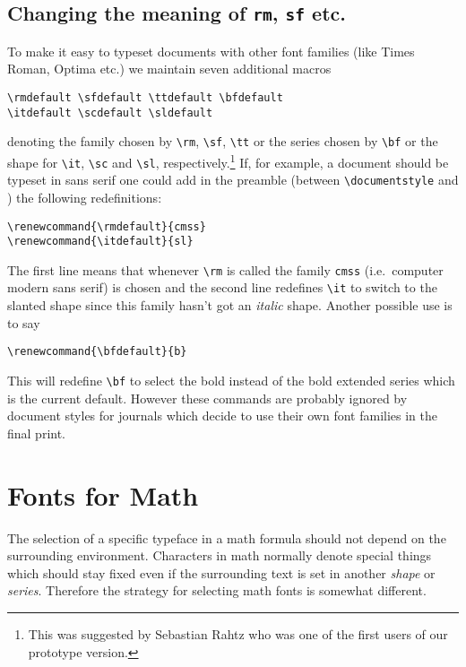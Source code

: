  \subsection{Changing the meaning of {\tt \protect\bslash rm},
 {\tt \protect\bslash sf} etc.}

  To make it easy to typeset documents with other font
  families (like Times Roman, Optima etc.) we maintain
  seven additional macros
  \begin{verbatim}
\rmdefault \sfdefault \ttdefault \bfdefault
\itdefault \scdefault \sldefault
\end{verbatim}
  denoting the family chosen by
  \verb=\rm=, \verb=\sf=, \verb=\tt= or the series chosen
  by \verb=\bf= or the shape for \verb=\it=,
  \verb=\sc= and \verb=\sl=, respectively.\footnote{This
  was suggested by Sebastian Rahtz who was one of the
  first users of our prototype version.}
  If, for example, a document should be typeset in sans serif
  one could add in the preamble (between \verb=\documentstyle=
  and \verb==) the following redefinitions:
\begin{verbatim}
\renewcommand{\rmdefault}{cmss}
\renewcommand{\itdefault}{sl}
\end{verbatim}
The first line means that whenever \verb=\rm= is called the
family {\tt cmss} (i.e.\ computer modern sans serif) is chosen
and the second line redefines \verb=\it= to switch to the slanted
shape since this family hasn't got an {\it italic} shape.
Another possible use is to say
\begin{verbatim}
\renewcommand{\bfdefault}{b}
\end{verbatim}
This will redefine \verb=\bf= to select the bold instead of the
bold extended series which is the current default.
However these commands are
probably ignored by document styles for journals which decide to
use their own font families in the final print.

 \section{Fonts for Math}

 The selection of a specific typeface in a math formula should not
 depend on the surrounding
 environment.  Characters in math normally denote special
               things which should stay fixed even if the surrounding
               text is set in another {\em shape\/} or {\em series}.
 Therefore the strategy for selecting math fonts is somewhat
 different.

